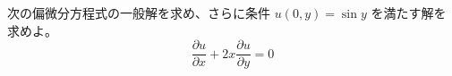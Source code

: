 
次の偏微分方程式の一般解を求め、さらに条件 $u(0, y) = \sin y$ を満たす解を求めよ。
\[
\frac{\partial u}{\partial x} + 2x\frac{\partial u}{\partial y} = 0
\]
